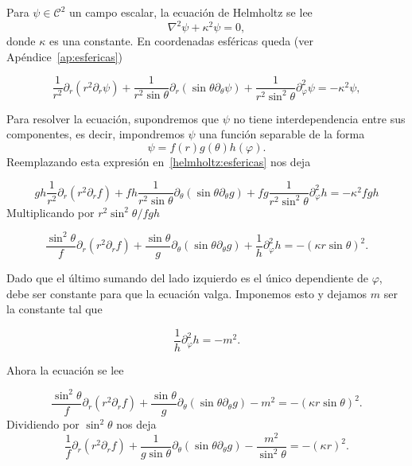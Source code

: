 \documentclass[11pt]{article}
\numberwithin{equation}{section}
\def\Cc{\mathcal{C}}
\begin{document}
Para \(\psi \in \Cc^2\) un campo escalar, la ecuación
de Helmholtz se lee
\begin{equation}
\label{helmholtz}
	\nabla^2 \psi + \kappa^2 \psi = 0
,\end{equation}
donde \(\kappa\) es una constante. En coordenadas esféricas queda
(ver Apéndice~\ref{ap:esfericas})

\begin{equation}\label{helmholtz:esfericas}
	\frac{1}{r^2} \partial_{r} \left(r^2 \partial_{r} \psi\right)
	+
	\frac{1}{r^2\sin\theta} \partial_{r} \left(\sin\theta \partial_{\theta} \psi\right)
	+
	\frac{1}{r^2\sin^2\theta} \partial^2_{\varphi} \psi
	=
	-\kappa^2 \psi
,\end{equation}

Para resolver la ecuación, supondremos que \(\psi\) no tiene interdependencia
entre sus componentes, es decir, impondremos \(\psi\) una función separable de la forma
\begin{equation}
	\psi = f(r) g(\theta) h(\varphi).
\end{equation}
Reemplazando esta expresión en~\eqref{helmholtz:esfericas} nos deja

\begin{displaymath}
	gh \frac{1}{r^2} \partial_{r} \left(r^2 \partial_{r} f\right)
	+
	fh \frac{1}{r^2 \sin\theta} \partial_{\theta} \left(\sin\theta
	\partial_{\theta} g\right)
	+
	fg \frac{1}{r^2\sin^2\theta} \partial^2_{\varphi} h
	=
	-\kappa^2 fgh
\end{displaymath}
Multiplicando por \(r^2 \sin^2\theta/fgh\)

\begin{displaymath}
	\frac{\sin^2\theta}{f} \partial_{r} \left(r^2 \partial_{r} f\right)
	+
	\frac{\sin\theta}{g} \partial_{\theta} \left(\sin\theta \partial_{\theta} g\right)
	+
	\frac{1}{h} \partial^2_{\varphi} h
	=
	-{(\kappa r \sin\theta)}^2.
\end{displaymath}

Dado que el último sumando del lado izquierdo es el único dependiente de
\(\varphi\), debe ser constante para que la ecuación valga. Imponemos esto y
dejamos \(m\) ser la constante tal que

\[
	\frac{1}{h} \partial^2_{\varphi} h = -m^2.
\]

Ahora la ecuación se lee

\[
	\frac{\sin^2\theta}{f} \partial_{r} \left(r^2 \partial_{r} f\right)
	+
	\frac{\sin\theta}{g} \partial_{\theta} \left(\sin\theta \partial_{\theta} g\right)
	-
	m^2
	=
	-(\kappa r \sin\theta)^2.
\]
Dividiendo por \(\sin^2\theta\) nos deja
\[
	\frac{1}{f} \partial_{r} \left(r^2 \partial_{r} f\right)
	+
	\frac{1}{g\sin\theta} \partial_{\theta} \left(\sin\theta \partial_{\theta} g\right)
	-
	\frac{m^2}{\sin^2\theta}
	=
	-(\kappa r)^2
.\]
\end{document}
